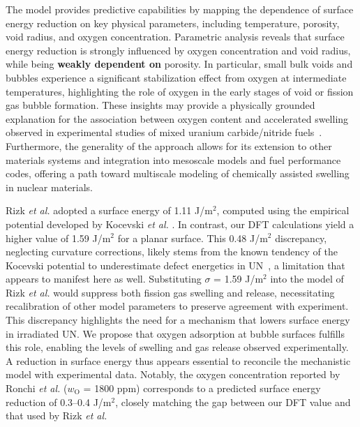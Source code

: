 \documentclass[preprint,12pt,sort&compress]{elsarticle}
\newcommand{\?}{\stackrel{?}{=}}
\providecommand{\DIFaddtex}[1]{{\bf #1}} %
\providecommand{\DIFdeltex}[1]{} %
\providecommand{\DIFaddbegin}{\protect\color{blue}} %
\providecommand{\DIFaddend}{\protect\color{black}} %
\providecommand{\DIFdelbegin}{\protect\color{red}} %
\providecommand{\DIFdelend}{\protect\color{black}} %
\providecommand{\DIFadd}[1]{\texorpdfstring{\DIFaddtex{#1}}{#1}} %
\providecommand{\DIFdel}[1]{\texorpdfstring{\DIFdeltex{#1}}{}} %
\newcommand{\DIFscaledelfig}{0.5}
\newlength{\DIFdelgraphicswidth} %
\newlength{\DIFdelgraphicsheight} %
\newcommand{\DIFaddincludegraphics}[2][]{{\color{blue}\fbox{\DIFOincludegraphics[#1]{#2}}}} %
\newcommand{\DIFdelincludegraphics}[2][]{%
\sbox{\DIFdelgraphicsbox}{\DIFOincludegraphics[#1]{#2}}%
\settoboxwidth{\DIFdelgraphicswidth}{\DIFdelgraphicsbox} %
\settoboxtotalheight{\DIFdelgraphicsheight}{\DIFdelgraphicsbox} %
\scalebox{\DIFscaledelfig}{%
\parbox[b]{\DIFdelgraphicswidth}{\usebox{\DIFdelgraphicsbox}\\[-\baselineskip] \rule{\DIFdelgraphicswidth}{0em}}\llap{\resizebox{\DIFdelgraphicswidth}{\DIFdelgraphicsheight}{%
\setlength{\unitlength}{\DIFdelgraphicswidth}%
\begin{picture}(1,1)%
\thicklines\linethickness{2pt} %
{\color[rgb]{1,0,0}\put(0,0){\framebox(1,1){}}}%
{\color[rgb]{1,0,0}\put(0,0){\line( 1,1){1}}}%
{\color[rgb]{1,0,0}\put(0,1){\line(1,-1){1}}}%
\end{picture}%
}\hspace*{3pt}}} %
} %
\DeclareRobustCommand{\DIFaddbegin}{\DIFOaddbegin \let\includegraphics\DIFaddincludegraphics} %
\DeclareRobustCommand{\DIFaddend}{\DIFOaddend \let\includegraphics\DIFOincludegraphics} %
\DeclareRobustCommand{\DIFdelbegin}{\DIFOdelbegin \let\includegraphics\DIFdelincludegraphics} %
\DeclareRobustCommand{\DIFdelend}{\DIFOaddend \let\includegraphics\DIFOincludegraphics} %
\begin{document}
\DIFaddend The model provides predictive capabilities by mapping the dependence of surface energy reduction on key physical parameters, including temperature, porosity, void radius, and oxygen concentration. Parametric analysis reveals that surface energy reduction is strongly influenced by oxygen concentration and void radius, while being \DIFdelbegin \DIFdel{nearly independent of }\DIFdelend \DIFaddbegin \DIFadd{weakly dependent on }\DIFaddend porosity. In particular, small bulk voids and bubbles experience a significant stabilization effect from oxygen at intermediate temperatures, highlighting the role of oxygen in the early stages of void or fission gas bubble formation. These insights may provide a physically grounded explanation for the association between oxygen content and accelerated swelling observed in experimental studies of mixed uranium carbide/nitride fuels~\cite{Rogozkin2003}. Furthermore, the generality of the approach allows for its extension to other materials systems and integration into mesoscale models and fuel performance codes, offering a path toward multiscale modeling of chemically assisted swelling in nuclear materials.

Rizk \textit{et al.} adopted a surface energy of 1.11 J/m$^2$, computed using the empirical potential developed by Kocevski \textit{et al.} \cite{Kocevski2022II}. In contrast, our DFT calculations yield a higher value of 1.59 J/m$^2$ for a planar surface. This 0.48 J/m$^2$ discrepancy, neglecting curvature corrections, likely stems from the known tendency of the Kocevski potential to underestimate defect energetics in UN~\cite{AbdulHameed2024}, a limitation that appears to manifest here as well. Substituting $\sigma$ = 1.59 J/m$^2$ into the model of Rizk \textit{et al.} would suppress both fission gas swelling and release, necessitating recalibration of other model parameters to preserve agreement with experiment. This discrepancy highlights the need for a mechanism that lowers surface energy in irradiated UN. We propose that oxygen adsorption at bubble surfaces fulfills this role, enabling the levels of swelling and gas release observed experimentally. A reduction in surface energy thus appears essential to reconcile the mechanistic model with experimental data. Notably, the oxygen concentration reported by Ronchi \textit{et al.} ($w_\text{O}$ = 1800 ppm) corresponds to a predicted surface energy reduction of 0.3--0.4 J/m$^2$, closely matching the gap between our DFT value and that used by Rizk \textit{et al.}
\end{document}

